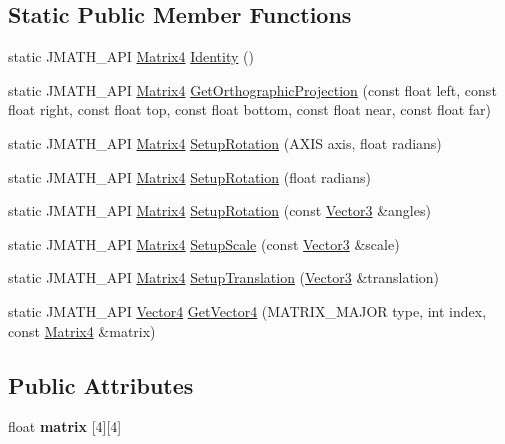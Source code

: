 \subsection*{Static Public Member Functions}
\begin{DoxyCompactItemize}
\item 
static J\+M\+A\+T\+H\+\_\+\+A\+P\+I \hyperlink{class_matrix4}{Matrix4} \hyperlink{class_matrix4_ae114a47efddacad2207eadac5f532098}{Identity} ()
\item 
static J\+M\+A\+T\+H\+\_\+\+A\+P\+I \hyperlink{class_matrix4}{Matrix4} \hyperlink{class_matrix4_a502588b330349fa7e5437a7932991cd2}{Get\+Orthographic\+Projection} (const float left, const float right, const float top, const float bottom, const float near, const float far)
\item 
static J\+M\+A\+T\+H\+\_\+\+A\+P\+I \hyperlink{class_matrix4}{Matrix4} \hyperlink{class_matrix4_abe74c189b54ee1f81546e5dcb50a1f0f}{Setup\+Rotation} (A\+X\+I\+S axis, float radians)
\item 
static J\+M\+A\+T\+H\+\_\+\+A\+P\+I \hyperlink{class_matrix4}{Matrix4} \hyperlink{class_matrix4_aca5189a3e5aaa40fa93ae1fe7402ad51}{Setup\+Rotation} (float radians)
\item 
static J\+M\+A\+T\+H\+\_\+\+A\+P\+I \hyperlink{class_matrix4}{Matrix4} \hyperlink{class_matrix4_a68930fdaa9d4535a537ea6625ce2beb3}{Setup\+Rotation} (const \hyperlink{class_vector3}{Vector3} \&angles)
\item 
static J\+M\+A\+T\+H\+\_\+\+A\+P\+I \hyperlink{class_matrix4}{Matrix4} \hyperlink{class_matrix4_a1537c917b5b50fce39366c82675fdf7c}{Setup\+Scale} (const \hyperlink{class_vector3}{Vector3} \&scale)
\item 
static J\+M\+A\+T\+H\+\_\+\+A\+P\+I \hyperlink{class_matrix4}{Matrix4} \hyperlink{class_matrix4_ab0bff8bab4b2ce631d9ea4177751d673}{Setup\+Translation} (\hyperlink{class_vector3}{Vector3} \&translation)
\item 
static J\+M\+A\+T\+H\+\_\+\+A\+P\+I \hyperlink{class_vector4}{Vector4} \hyperlink{class_matrix4_a41877ff86429437f4f2a693fe12fc090}{Get\+Vector4} (M\+A\+T\+R\+I\+X\+\_\+\+M\+A\+J\+O\+R type, int index, const \hyperlink{class_matrix4}{Matrix4} \&matrix)
\end{DoxyCompactItemize}
\subsection*{Public Attributes}
\begin{DoxyCompactItemize}
\item 
\hypertarget{class_matrix4_aeaa37098ab47ee881e929f94943b424a}{float {\bfseries matrix} \mbox{[}4\mbox{]}\mbox{[}4\mbox{]}}\label{class_matrix4_aeaa37098ab47ee881e929f94943b424a}

\end{DoxyCompactItemize}
